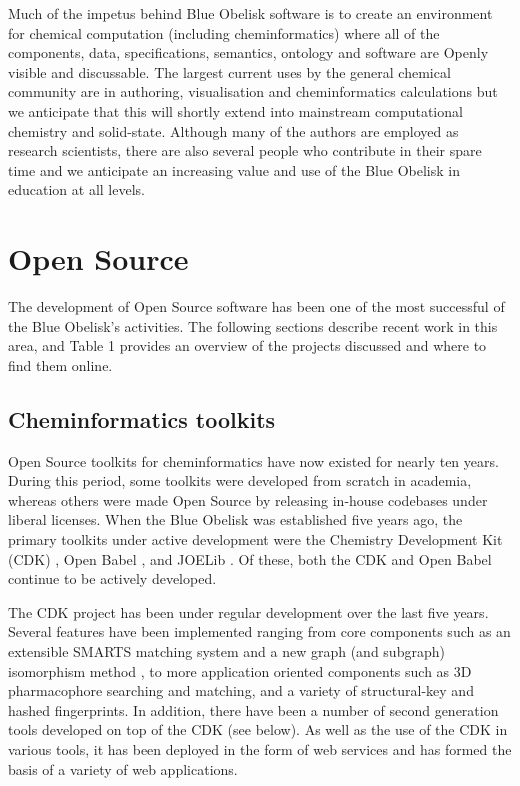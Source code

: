 \documentclass[10pt]{bmc_article}
\newenvironment{bmcformat}{\begin{raggedright}\baselineskip20pt\sloppy\setboolean{publ}{false}}{\end{raggedright}\baselineskip20pt\sloppy}
\begin{document}
\begin{bmcformat}
Much of the impetus behind Blue Obelisk software is to create an
environment for chemical computation (including cheminformatics) where
all of the components, data, specifications, semantics, ontology and
software are Openly visible and discussable. The largest current uses
by the general chemical community are in authoring, visualisation and
cheminformatics calculations but we anticipate that this will shortly
extend into mainstream computational chemistry and solid-state.
Although many of the authors are employed as research scientists,
there are also several people who contribute in their spare time and
we anticipate an increasing value and use of the Blue Obelisk in
education at all levels.


\section*{Open Source}

The development of Open Source software has been one of the most
successful of the Blue Obelisk's activities. The following sections
describe recent work in this area, and Table 1
provides an overview of the projects
discussed and where to find them online.

\subsection*{Cheminformatics toolkits}

Open Source toolkits for cheminformatics have now existed for nearly
ten years. During this period, some toolkits were developed from
scratch in academia, whereas others were made Open Source by releasing in-house
codebases under liberal licenses. When the Blue Obelisk was
established five years ago, the primary toolkits under active development
were the Chemistry Development Kit (CDK)
\cite{Steinbeck2003, Steinbeck2006}, Open Babel \cite{WebOpen Babel},
and JOELib \cite{WebJOELib}. Of these, both the CDK and Open Babel
continue to be actively developed.

The CDK project has been under regular development over the last five
years. Several features have been implemented ranging from core
components such as an extensible SMARTS matching system and a new graph
(and
subgraph) isomorphism method \cite{smsd}, to more application oriented
components such as 3D pharmacophore searching and matching, and a variety
of structural-key and hashed fingerprints. In addition, there have
been a number of second generation tools developed on top of the CDK
(see below). As well as the use of the CDK in various tools, it has been deployed in
the form of web services \cite{Dong:2007aa} and has formed the basis
of a variety of web applications.


\end{bmcformat}
\end{document}
